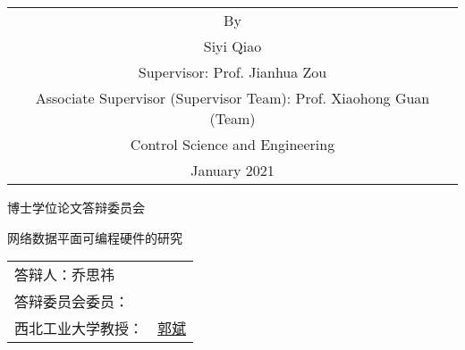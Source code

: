 \begin{titlepage}
\begin{center}
		\vspace{3cm}
		{\sanhao
			\begin{center} \renewcommand{\arraystretch}{1.5}
				\begin{tabular}{c}
					By \\
					Siyi Qiao \\
					Supervisor: Prof. Jianhua Zou \\
					Associate Supervisor (Supervisor Team): Prof.  Xiaohong Guan (Team)\\%
					Control Science and Engineering \\
					January 2021 \\ %
				\end{tabular} \renewcommand{\arraystretch}{1}
			\end{center} 
		}
	\end{center}
	\clearpage{\pagestyle{empty}\cleardoublepage}
	
	\newpage\thispagestyle{empty}
	\begin{center}
		\parbox[t][0.7cm][t]{\textwidth}{}
		
		\begin{center}{\boldsong 博士学位论文答辩委员会}\end{center}
		
		\vspace{1cm}
		\begin{center}{\boldsong 网络数据平面可编程硬件的研究}\end{center}
		
		\vspace{6cm}
		{\sanhao
			\begin{center} \renewcommand{\arraystretch}{1.5}
				\begin{tabular}{ll}
					\multicolumn{2}{l}{答辩人：乔思祎}\\
					\multicolumn{2}{l}{答辩委员会委员：}\\
					\multicolumn{1}{r}{西北工业大学教授：} & \underline{\hspace{1.5em}郭斌\hspace{7.5em}}\\
					

\end{tabular}
\end{center}}
\end{center}
\end{titlepage}
